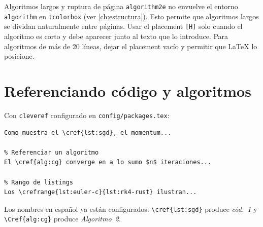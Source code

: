 \begin{observacion}{Algoritmos largos y ruptura de página}
\texttt{algorithm2e} no envuelve el entorno \texttt{algorithm} en
\texttt{tcolorbox} (ver \cref{ch:estructura}). Esto permite que algoritmos
largos se dividan naturalmente entre páginas. Usar el placement \texttt{[H]}
solo cuando el algoritmo es corto y debe aparecer junto al texto que lo
introduce. Para algoritmos de más de 20 líneas, dejar el placement vacío y
permitir que \LaTeX{} lo posicione.
\end{observacion}

\section{Referenciando código y algoritmos}
\label{sec:ref-codigo}

Con \texttt{cleveref} configurado en \texttt{config/packages.tex}:

\begin{lstlisting}[style=latex, frame=none, numbers=none]
% Referenciar un bloque de listing
Como muestra el \cref{lst:sgd}, el momentum...

% Referenciar un algoritmo
El \cref{alg:cg} converge en a lo sumo $n$ iteraciones...

% Rango de listings
Los \crefrange{lst:euler-c}{lst:rk4-rust} ilustran...
\end{lstlisting}

Los nombres en español ya están configurados: \texttt{\textbackslash cref\{lst:sgd\}}
produce \textit{cód.~1} y \texttt{\textbackslash Cref\{alg:cg\}} produce
\textit{Algoritmo~2}.

\printbibliography[heading=subbibliography]

